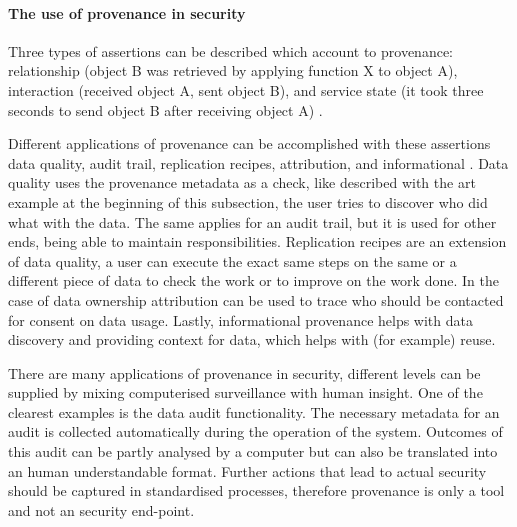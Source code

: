 \paragraph{The use of provenance in security}
\label{provenance-use}

Three types of assertions can be described which account to provenance: relationship (object B was retrieved by applying function X to object A), interaction (received object A, sent object B), and service state (it took three seconds to send object B after receiving object A) \cite{dsp4moreau}.

Different applications of provenance can be accomplished with these assertions \eg{} data quality, audit trail, replication recipes, attribution, and informational \cite{dsp1simmhan}.
Data quality uses the provenance metadata as a check, like described with the art example at the beginning of this subsection, the user tries to discover who did what with the data.
The same applies for an audit trail, but it is used for other ends, being able to maintain responsibilities.
Replication recipes are an extension of data quality, a user can execute the exact same steps on the same or a different piece of data to check the work or to improve on the work done.
In the case of data ownership attribution can be used to trace who should be contacted for consent on data usage.
Lastly, informational provenance helps with data discovery and providing context for data, which helps with (for example) reuse.

There are many applications of provenance in security, different levels can be supplied by mixing computerised surveillance with human insight.
One of the clearest examples is the data audit functionality.
The necessary metadata for an audit is collected automatically during the operation of the system.
Outcomes of this audit can be partly analysed by a computer but can also be translated into an human understandable format.
Further actions that lead to actual security should be captured in standardised processes, therefore provenance is only a tool and not an security end-point.

